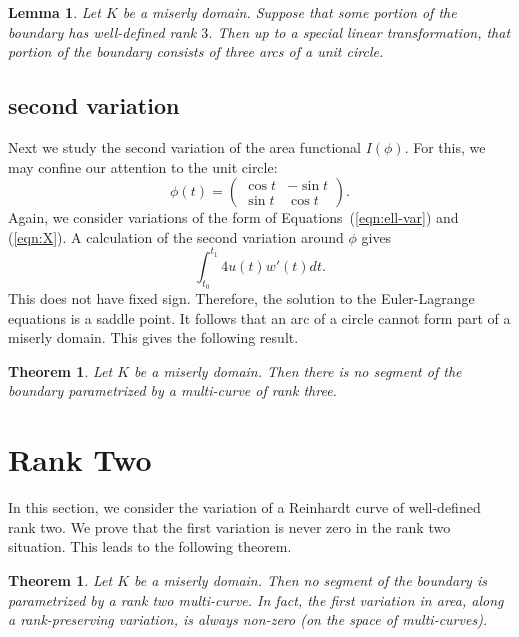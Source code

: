 \documentclass[11pt]{amsart}
\newtheorem{thm}[equation]{Theorem}
\newtheorem{lemma}[equation]{Lemma}
\begin{document}
\begin{lemma} Let $K$ be a miserly domain.  Suppose that some portion
  of the boundary has well-defined rank $3$.  Then up to a special
  linear transformation, that portion of the boundary consists of
  three arcs of a unit circle.
\end{lemma}


\subsection{second variation}

Next we study the second variation of the area functional $I(\phi)$.  For this,
we may confine our attention to the unit circle:
\[
\phi(t) = \begin{pmatrix} \cos t & -\sin t \\ \sin t & \cos t
\end{pmatrix}.
\]
Again, we consider variations of the form of
Equations~(\ref{eqn:ell-var}) and (\ref{eqn:X}).  A calculation of the
second variation around $\phi$ gives
\[
\int_{t_0}^{t_1} 4 u(t) w'(t) dt.
\]
This does not have fixed sign.  Therefore, the solution to the
Euler-Lagrange equations is a saddle point.  It follows that an arc of
a circle cannot form part of a miserly domain.  This gives the
following result.

\begin{thm}  Let $K$ be a miserly domain.  Then there is no segment
of the boundary parametrized by a multi-curve of  rank  three.
\end{thm}



\section{Rank Two}


In this section, we consider the variation of a Reinhardt curve of
well-defined rank two.  We prove that the first variation is never
zero in the rank two situation.  This leads to the following theorem.

\begin{thm} Let $K$ be a miserly domain.  Then no segment of the
  boundary is parametrized by a rank two multi-curve.  In fact, the
  first variation in area, along a rank-preserving variation, is
  always non-zero (on the space of multi-curves).
\end{thm}
\end{document}
